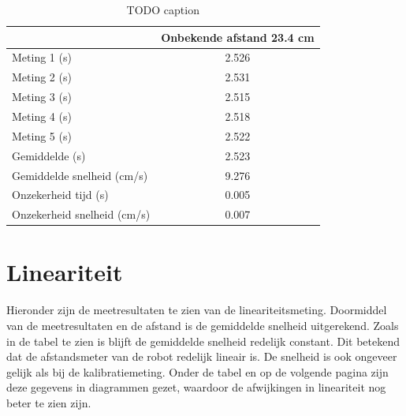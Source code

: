 \documentclass{report}
\begin{document}
\begin{table}
 \centering
\begin{tabular}{| l| c|}
\hline
    & Onbekende afstand 23.4 cm\\
\hline
   Meting 1 (s) & 2.526 \\
\hline
   Meting 2 (s) & 2.531 \\
\hline
   Meting 3 (s) & 2.515 \\
\hline
   Meting 4 (s) & 2.518 \\
\hline
   Meting 5 (s) & 2.522 \\
\hline
   Gemiddelde (s) & 2.523 \\
\hline
   Gemiddelde snelheid (cm/s) & 9.276 \\
\hline
   Onzekerheid tijd (s) & 0.005 \\
\hline
   Onzekerheid snelheid (cm/s) & 0.007 \\
\hline
 \end{tabular}
\caption{TODO caption}
\end{table}

\section{Lineariteit}
Hieronder zijn de meetresultaten te zien van de lineariteitsmeting. Doormiddel van de meetresultaten en de afstand is de gemiddelde snelheid uitgerekend. Zoals in de tabel te zien is blijft de gemiddelde snelheid redelijk constant. Dit betekend dat de afstandsmeter van de robot redelijk lineair is. De snelheid is ook ongeveer gelijk als bij de kalibratiemeting. Onder de tabel en op de volgende pagina zijn deze gegevens in diagrammen gezet, waardoor de afwijkingen in lineariteit nog beter te zien zijn. 
\end{document}
